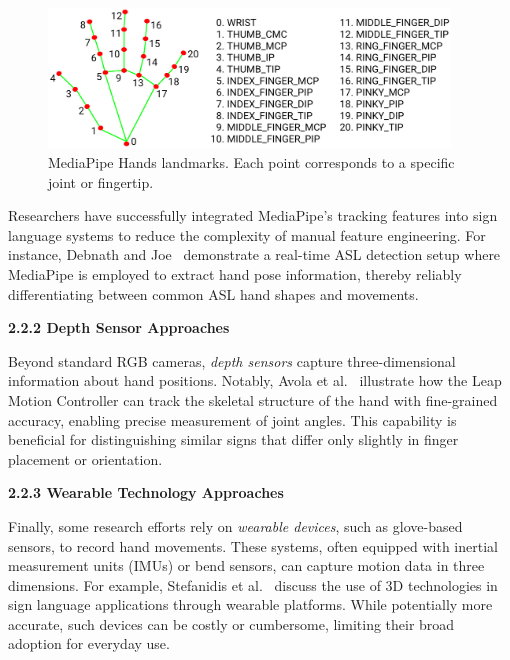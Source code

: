 \documentclass[12pt]{article}
\begin{document}
\begin{figure}[h!]
  \centering
  \includegraphics[width=0.95\textwidth]{MediaPipe_hands.png}
  \caption{MediaPipe Hands landmarks. Each point corresponds to a specific joint or fingertip.}
  \label{fig:mediapipe_hands}
\end{figure}

Researchers have successfully integrated MediaPipe’s tracking features into sign language 
systems to reduce the complexity of manual feature engineering. For instance, Debnath and 
Joe~\cite{ref3} demonstrate a real-time ASL detection setup where MediaPipe is employed to extract 
hand pose information, thereby reliably differentiating between common ASL hand shapes 
and movements.

\vspace{1.0em}
\noindent
\textbf{2.2.2 Depth Sensor Approaches}
\vspace{0.5em}

Beyond standard RGB cameras, \textit{depth sensors} capture three-dimensional information 
about hand positions. Notably, Avola et al.~\cite{ref4} illustrate how the Leap Motion Controller 
can track the skeletal structure of the hand with fine-grained accuracy, enabling precise 
measurement of joint angles. This capability is beneficial for distinguishing 
similar signs that differ only slightly in finger placement or orientation.

\vspace{1.0em}
\noindent
\textbf{2.2.3 Wearable Technology Approaches}
\vspace{0.5em}

Finally, some research efforts rely on \textit{wearable devices}, such as glove-based sensors, to 
record hand movements. These systems, often equipped with inertial measurement units 
(IMUs) or bend sensors, can capture motion data in three dimensions. For example, 
Stefanidis et al.~\cite{ref5} discuss the use of 3D technologies in sign language applications 
through wearable platforms. While potentially more accurate, such devices can be costly or 
cumbersome, limiting their broad adoption for everyday use.
\end{document}
